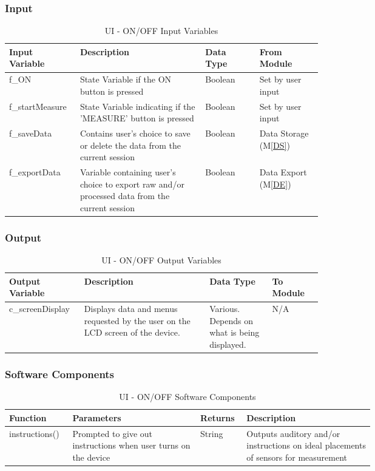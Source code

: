 \documentclass{article}
\begin{document}
\begin{description}
        \subsubsection{Input}
            \begin{longtable}{|l|p{0.4\linewidth}|l|p{0.2\linewidth}|}
            \caption{UI - ON/OFF Input Variables}
            \hline
            \textbf{Input Variable} & \textbf{Description} & \textbf {Data Type} & \textbf{From Module} \\
            \endhead
            \hline
            f\_ON   & State Variable if the ON button is pressed & Boolean & Set by user input \\
            \hline
            f\_startMeasure   & State Variable indicating if the 'MEASURE' button is pressed & Boolean & Set by user input \\
            \hline
            f\_saveData   & Contains user's choice to save or delete the data from the current session & Boolean & Data Storage (M\ref{DS})\\
            \hline
            f\_exportData   & Variable containing user's choice to export raw and/or processed data from the current session & Boolean & Data Export (M\ref{DE})\\
            \hline
            \end{longtable}
        \newpage
        \subsubsection{Output}
            \begin{longtable}{|l|p{0.4\linewidth}|p{0.2\linewidth}|l|}
           \caption{UI - ON/OFF Output Variables}
            \hline
            \textbf{Output Variable} & \textbf{Description} & \textbf {Data Type} & \textbf{To Module} \\
            \endhead
            \hline
            c\_screenDisplay   & Displays data and menus requested by the user on the LCD screen of the device. & Various. Depends on what is being displayed. & N/A \\
            \hline
            \end{longtable}

        \subsubsection{Software Components}
            \noindent
                \begin{longtable}{|l|p{0.35\linewidth}|l|p{0.35\linewidth}|}
                \caption{UI - ON/OFF Software Components}
                \hline
                \textbf{Function} & \textbf{Parameters} & \textbf {Returns} & \textbf{Description} \\
                \endhead
                \hline
                instructions()  & Prompted to give out instructions when user turns on the device & String & Outputs auditory and/or instructions on ideal placements of sensors for measurement\\
                \hline
                \end{longtable}
            \noindent

\end{description}
\end{document}
